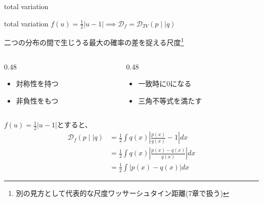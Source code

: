 \begin{frame}[shrink]{total variation}
    \small
    \begin{exampleblock}{total variation}
        \centering$\mathit{f}(u)=\frac{1}{2}|u-1| \implies \mathcal{D}_{f}=\mathcal{D}_{TV}(p\mid\mid q)$\\
    \end{exampleblock}
    二つの分布の間で生じうる最大の確率の差を捉える尺度\footnote{別の見方として代表的な尺度ワッサーシュタイン距離(7章で扱う)}
    \begin{columns}[T]
        \begin{column}{0.48\textwidth}
            \begin{itemize}
                \item 対称性を持つ
                \item 非負性をもつ
            \end{itemize}
        \end{column}
        \begin{column}{0.48\textwidth}
            \begin{itemize}
                \item 一致時に0になる
                \item 三角不等式を満たす
            \end{itemize}
        \end{column}
    \end{columns}

    \begin{exampleblock}{}
    $\mathit{f}(u)=\frac{1}{2}|u-1|$とすると、
    \begin{align*}
        \mathcal{D}_{f}(p\mid\mid q)
        &=\frac{1}{2}\int q(x)|\frac{p(x)}{q(x)}-1|dx\\
        &=\frac{1}{2}\int q(x)|\frac{p(x)-q(x)}{q(x)}|dx\\
        &=\frac{1}{2}\int |p(x)-q(x)|dx
    \end{align*}
    \end{exampleblock}
\end{frame}
